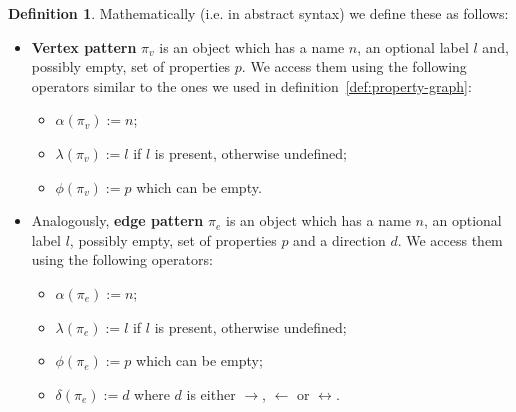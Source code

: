\documentclass[14pt]{constructor-thesis}
\theoremstyle{definition}
\newtheorem{definition}{Definition}
\begin{document}
\begin{definition} Mathematically (i.e. in abstract syntax) we define these as follows:
  \begin{itemize}
    \item \textbf{Vertex pattern} $\pi_v$ is an object which has a name $n$, an optional label $l$ and, possibly empty, set of properties $p$. We access them using the following operators similar to the ones we used in definition~\ref{def:property-graph}:
    \begin{itemize}
      \item $\alpha(\pi_v) := n$;
      \item $\lambda(\pi_v) := l$ if $l$ is present, otherwise undefined;
      \item $\phi(\pi_v) := p$ which can be empty.
    \end{itemize}

    \item Analogously, \textbf{edge pattern} $\pi_e$ is an object which has a name $n$, an optional label $l$, possibly empty, set of properties $p$ and a direction $d$. We access them using the following operators:
    \begin{itemize}
      \item $\alpha(\pi_e) := n$;
      \item $\lambda(\pi_e) := l$ if $l$ is present, otherwise undefined;
      \item $\phi(\pi_e) := p$ which can be empty;
      \item $\delta(\pi_e) := d$ where $d$ is either $\rightarrow$, $\leftarrow$ or $\leftrightarrow$.
    \end{itemize}
  \end{itemize}
\end{definition}


\end{document}
